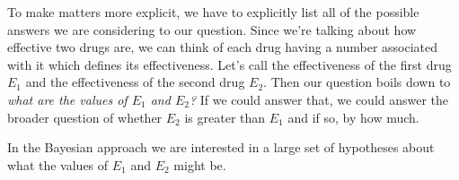 \documentclass[a4paper, 12pt]{article}
\begin{document}
To make matters more explicit, we have to explicitly list all of the possible answers
we are considering to our question. Since we're talking about how effective
two drugs are, we can think of each drug having a number associated with it
which defines its effectiveness. Let's call the effectiveness of the first drug
$E_1$ and the effectiveness of the second drug $E_2$. Then our question boils
down to {\em what are the values of $E_1$ and $E_2$?} If we could answer that,
we could answer the broader question of whether $E_2$ is greater than $E_1$ and
if so, by how much.

In the Bayesian approach we are interested in a large set of hypotheses about
what the values of $E_1$ and $E_2$ might be.









\end{document}
